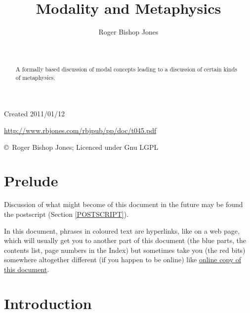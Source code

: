 \documentclass[11pt]{article}
\title{Modality and Metaphysics}
\author{Roger Bishop Jones}
\date{\ }
\begin{document}
\begin{titlepage}
\maketitle
\begin{abstract}
A formally based discussion of modal concepts leading to a discussion of certain kinds of metaphysics.
\end{abstract}
\vfill

\begin{centering}
{\footnotesize

Created 2011/01/12



\href{http://www.rbjones.com/rbjpub/pp/doc/t045.pdf}
{http://www.rbjones.com/rbjpub/pp/doc/t045.pdf}

\copyright\ Roger Bishop Jones; Licenced under Gnu LGPL

}%
\end{centering}

\thispagestyle{empty}
\end{titlepage}

\newpage
\addtocounter{page}{1}
{\parskip=0pt\tableofcontents}

\section{Prelude}

Discussion of what might become of this document in the future may be found the postscript (Section \ref{POSTSCRIPT}).

In this document, phrases in coloured text are hyperlinks, like on a web page, which will usually get you to another part of this document (the blue parts, the contents list, page numbers in the Index) but sometimes take you (the red bits) somewhere altogether different (if you happen to be online) like \href{http://rbjones.com/rbjpub/pp/doc/t045.pdf}{online copy of this document}.

\section{Introduction}
\end{document}
